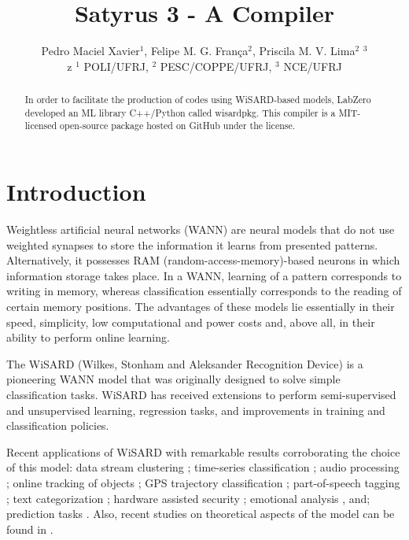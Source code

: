 \documentclass[12pt]{article}
\title{Satyrus 3 - A Compiler}
\author{Pedro Maciel Xavier$^1$, Felipe M. G. Fran\c{c}a$^2$, Priscila M. V. Lima$^2$ $^3$\\z
$^1$ POLI/UFRJ, $^2$ PESC/COPPE/UFRJ, $^3$ NCE/UFRJ}
\begin{document}
\nocite{*}

\maketitle

\begin{abstract}
    In order to facilitate the production of codes using WiSARD-based models, LabZero developed an ML library C++/Python called wisardpkg. This compiler is a MIT-licensed open-source package hosted on GitHub under the license.
\end{abstract}

\section{Introduction}

Weightless  artificial  neural  networks  (WANN)  are  neural  models
that  do  not  use weighted synapses to store the information it learns from presented patterns. Alternatively, it possesses RAM (random-access-memory)-based neurons in which information storage takes place. In a WANN, learning of a pattern corresponds to writing in memory, whereas classification essentially corresponds to the reading of certain memory positions. The advantages of these models lie essentially in their speed, simplicity, low computational and power costs and, above all, in their ability to perform online learning.

The WiSARD (Wilkes, Stonham and Aleksander Recognition Device) \cite{aleksander} is a pioneering WANN model that was originally designed to solve simple classification tasks. WiSARD has received extensions to perform semi-supervised and unsupervised learning, regression tasks, and improvements in training and classification policies.

Recent applications of WiSARD with remarkable results corroborating the choice of this model: data stream clustering \cite{douglas, douglas2, douglas3}; time-series classification \cite{souza2014}; audio processing \cite{souza2015}; online tracking of objects \cite{nascimento2015}; GPS trajectory classification \cite{barbosa2018}; part-of-speech tagging \cite{carneiro2015, carneiro2017}; text categorization \cite{rangel2016}; hardware assisted security \cite{santiago2019}; emotional analysis \cite{vidal2013, lusquinofilho2018, aus, empathy}, and; prediction tasks \cite{rew, lusquino2020}. Also, recent studies on theoretical aspects of the model can be found in \cite{carneiro2019}.
\end{document}
